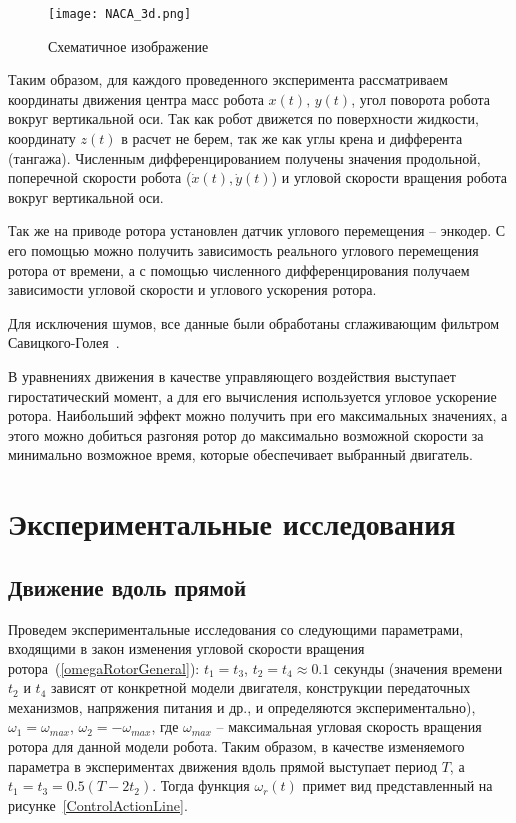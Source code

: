 \begin{figure}[!ht]
	\centering
	\texttt{[image: NACA\_3d.png]}
	\caption{Схематичное изображение }
	\label{NACA_3d}
\end{figure}

Таким образом, для каждого проведенного эксперимента рассматриваем координаты движения центра масс робота $ x(t),\,y(t)$, угол поворота робота вокруг вертикальной оси. Так как робот движется по поверхности жидкости, координату $ z(t) $ в расчет не берем, так же как углы крена и дифферента (тангажа). Численным дифференцированием получены значения продольной, поперечной скорости робота ($ \dot{x}(t), \dot{y}(t) $) и угловой скорости вращения робота вокруг вертикальной оси.

Так же на приводе ротора установлен датчик углового перемещения -- энкодер. С его помощью можно получить зависимость реального углового перемещения ротора от времени, а с помощью численного дифференцирования получаем зависимости угловой скорости и углового ускорения ротора.

Для исключения шумов, все данные были обработаны сглаживающим фильтром Савицкого-Голея~\cite{Savitzky_Golay_1964}.

В уравнениях движения в качестве управляющего воздействия выступает гиростатический момент, а для его вычисления используется угловое ускорение ротора. Наибольший эффект можно получить при его максимальных значениях, а этого можно добиться разгоняя ротор до максимально возможной скорости за минимально возможное время, которые обеспечивает выбранный двигатель.

\section{Экспериментальные исследования}

\subsection{Движение вдоль прямой}

Проведем экспериментальные исследования со следующими параметрами, входящими в закон изменения угловой скорости вращения ротора~(\ref{omegaRotorGeneral}): $t_1=t_3$, $ t_2 = t_4 \approx 0.1 $ секунды (значения времени $ t_2$ и $ t_4 $ зависят от конкретной модели двигателя, конструкции передаточных механизмов, напряжения питания и др., и определяются экспериментально), $ \omega_1 = \omega_{max} $, $ \omega_2 = -\omega_{max} $, где $ \omega_{max} $ -- максимальная угловая скорость вращения ротора для данной модели робота. Таким образом, в качестве изменяемого параметра в экспериментах движения вдоль прямой выступает период $ T $, а $t_1=t_3 = 0.5(T - 2t_2)$. Тогда функция $ \omega_r(t) $ примет вид представленный на рисунке~\ref{ControlActionLine}.

